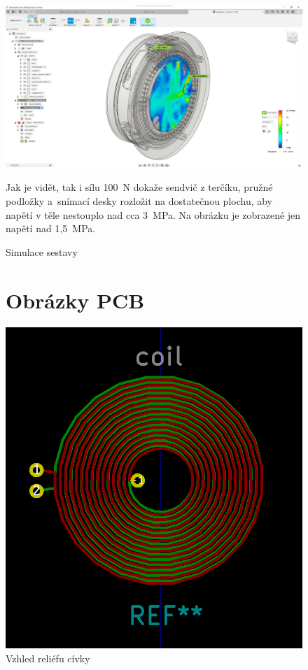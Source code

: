 \begin{figure}
    \centering
    \includegraphics[width=\textwidth]{kapitoly/obrazky/E4/machanika_tlakove_desky/simulace/zjednodusena_sestava_pri_F100N_nezobrazeno_napeti_pod_1,5MPa.png}
    \caption{Simulace sestavy}
    Jak je vidět, tak i sílu 100~N dokaže sendvič z terčíku, pružné podložky a~snímací desky rozložit na dostatečnou plochu, aby napětí v těle nestouplo 
    nad cca 3~MPa. Na obrázku je zobrazené jen napětí nad 1,5~MPa.
    \label{fig:E4-simulace_tlakovky}
\end{figure}



\begin{figure}
\section{Obrázky PCB}
    \vspace{\OdsazeniNadpisu}
    \centering
    \includegraphics[width=\textwidth]{kapitoly/obrazky/E4/elektronika_tlakove_desky/civka.png}
    \caption{Vzhled reliéfu cívky}
    \label{fig:E4-relief_civka}
\end{figure}

